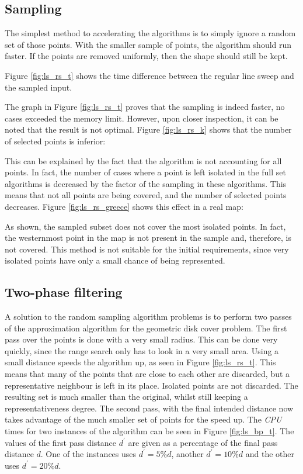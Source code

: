 \subsection{Sampling}
The simplest method to accelerating the algorithms is to simply ignore a random set of those points. With the smaller sample of points, the algorithm should run faster. If the points are removed uniformly, then the shape should still be kept.

Figure \ref{fig:ls_rs_t} shows the time difference between the regular line sweep and the sampled input.



The graph in Figure \ref{fig:ls_rs_t} proves that the sampling is indeed faster, no cases exceeded the memory limit. However, upon closer inspection, it can be noted that the result is not optimal. Figure \ref{fig:ls_rs_k} shows that the number of selected points is inferior:



This can be explained by the fact that the algorithm is not accounting for all points. In fact, the number of cases where a point is left isolated in the full set algorithms is decreased by the factor of the sampling in these algorithms. This means that not all points are being covered, and the number of selected points decreases. Figure \ref{fig:ls_rs_greece} shows this effect in a real map:



As shown, the sampled subset does not cover the most isolated points. In fact, the westernmost point in the map is not present in the sample and, therefore, is not covered. This method is not suitable for the initial requirements, since very isolated points have only a small chance of being represented.

\subsection{Two-phase filtering}
A solution to the random sampling algorithm problems is to perform two passes of the approximation algorithm for the geometric disk cover problem. The first pass over the points is done with a very small radius. This can be done very quickly, since the range search only has to look in a very small area. Using a small distance speeds the algorithm up, as seen in Figure \ref{fig:ls_rs_t}. This means that many of the points that are close to each other are discarded, but a representative neighbour is left in its place. Isolated points are not discarded. The resulting set is much smaller than the original, whilst still keeping a representativeness degree. The second pass, with the final intended distance now takes advantage of the much smaller set of points for the speed up. The \emph{CPU} times for two instances of the algorithm can be seen in Figure \ref{fig:ls_bp_t}. The values of the first pass distance $d^\prime$ are given as a percentage of the final pass distance $d$. One of the instances uses $d^\prime=5\%d$, another $d^\prime=10\%d$ and the other uses $d^\prime=20\%d$.

